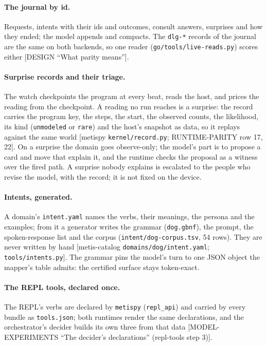 \documentclass[11pt]{article}
\newcommand{\metispy}{\texttt{metispy}}
\newcommand{\src}[1]{{\footnotesize\textsf{[#1]}}}
\begin{document}
\paragraph{The journal by id.} Requests, intents with their ids and outcomes, consult
answers, surprises and how they ended; the model appends and compacts. The \texttt{dlg-*}
records of the journal are the same on both backends, so one reader
(\texttt{go/tools/live-reads.py}) scores either \src{DESIGN ``What parity means''}.

\paragraph{Surprise records and their triage.} The watch checkpoints the program at every
beat, reads the host, and prices the reading from the checkpoint. A reading no run reaches
is a surprise: the record carries the program key, the steps, the start, the observed
counts, the likelihood, its kind (\texttt{unmodeled} or \texttt{rare}) and the host's
snapshot as data, so it replays against the same world \src{metispy \texttt{kernel/record.py};
RUNTIME-PARITY row 17, 22}. On a surprise the domain goes observe-only; the model's part is
to propose a card and move that explain it, and the runtime checks the proposal as a witness
over the fired path. A surprise nobody explains is escalated to the people who revise the
model, with the record; it is not fixed on the device.

\paragraph{Intents, generated.} A domain's \texttt{intent.yaml} names the verbs, their
meanings, the persona and the examples; from it a generator writes the grammar
(\texttt{dog.gbnf}), the prompt, the spoken-response list and the corpus
(\texttt{intent/dog-corpus.tsv}, 54 rows). They are never written by hand \src{metis-catalog
\texttt{domains/dog/intent.yaml}; \texttt{tools/intents.py}}. The grammar pins the model's
turn to one JSON object the mapper's table admits: the certified surface stays token-exact.

\paragraph{The REPL tools, declared once.} The REPL's verbs are declared by \metispy{}
(\texttt{repl\_api}) and carried by every bundle as \texttt{tools.json}; both runtimes
render the same declarations, and the orchestrator's decider builds its own three from
that data \src{MODEL-EXPERIMENTS ``The decider's declarations'' (repl-tools step 3)}.
\end{document}
